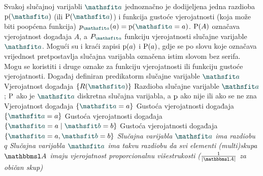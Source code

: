 {Svakoj slučajnoj varijabli $\rvar a$ jednoznačno je dodijeljena jedna razdioba $\p(\rvar a)$ (ili $\P(\rvar a)$) i funkcija gustoće vjerojatnosti (koja može biti poopćena funkcija) $p_{\rvar a}(a)=\p(\rvar a=a)$. $\P(A)$ označava vjerojatnost događaja $A$, a $P_{\rvar a}$ funkciju vjerojatnosti slučajne varijable $\rvar a$. Mogući su i kraći zapisi $\p(a)$ i $\P(a)$, gdje se po slovu koje označava vrijednost pretpostavlja slučajna varijabla označena istim slovom bez serifa. Mogu se koristiti i druge oznake za funkciju vjerojatnosti ili funkciju gustoće vjerojatnosti.}
 {Događaj definiran predikatorm slučajne varijable $\rvar a$}
 {Vjerojatnost događaja $\cbr{R(\rvar a)}$}
 {Razdioba slučajne varijable $\rvar a$; $\P$ ako je $\rvar a$ diskretna slučajna varijabla, a $\p$ ako nije ili ako se ne zna}
 {Vjerojatnost događaja $\cbr{\rvar a=a}$}
 {Gustoća vjerojatnosti događaja $\cbr{\rvar a=a}$}
 {Gustoća vjerojatnosti događaja $\cbr{\rvar a=a\mid\rvar b=b}$}
 {Gustoća vjerojatnosti događaja $\cbr{\rvar a=a,\rvar b=b}$}
 {\textit{Slučajna varijabla $\rvar a$ ima razdiobu $q$}}
 	{\textit{Slučajna varijabla $\rvar a$ ima takvu razdiobu da svi elementi (multi)skupa $\set A$ imaju vjerojatnost proporcionalnu višestrukosti ($\frac{1}{\envert{\set A}}$ za običan skup)}}
